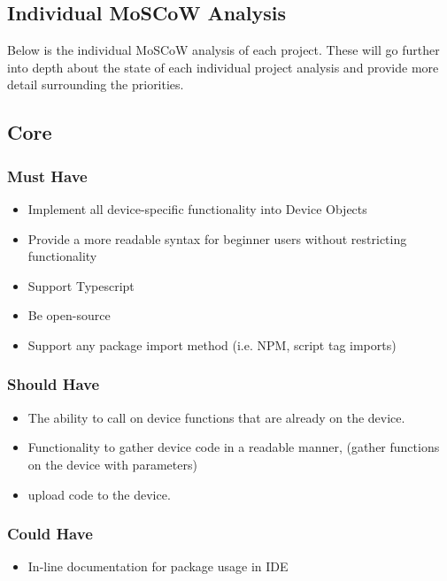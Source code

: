 \documentclass{l4proj}
\begin{document}
%
% 

\begin{appendices}
\chapter{Individual MoSCoW Analysis}


\label{appendix:MOSCOWAnalysis}

Below is the individual MoSCoW analysis of each project. These will go further into depth about the state of each individual project analysis and provide more detail surrounding the priorities.


\section{Core}
\subsection{Must Have}
\begin{itemize}
    \item Implement all device-specific functionality into Device Objects
    \item Provide a more readable syntax for beginner users without restricting functionality
    \item Support Typescript
    \item Be open-source
    \item Support any package import method (i.e. NPM, script tag imports)
\end{itemize}
\subsection{Should Have}
\begin{itemize}
    \item The ability to call on device functions that are already on the device.
    \item Functionality to gather device code in a readable manner, (gather functions on the device with parameters)
    \item upload code to the device.
\end{itemize}
\subsection{Could Have}
\begin{itemize}
    \item In-line documentation for package usage in IDE
\end{itemize}


\end{appendices}
\end{document}
